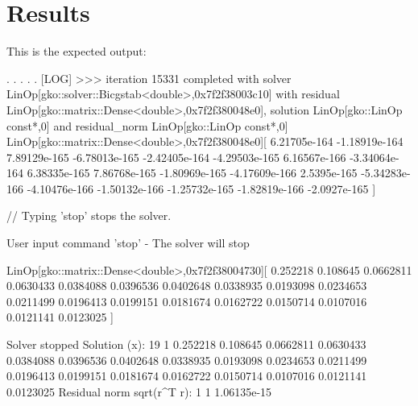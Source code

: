 \section*{Results}

This is the expected output\+:


\begin{DoxyCode}
.
.
.
.
.
[LOG] >>> iteration 15331 completed with solver LinOp[gko::solver::Bicgstab<double>,0x7f2f38003c10] with 
      residual LinOp[gko::matrix::Dense<double>,0x7f2f380048e0], solution LinOp[gko::LinOp \textcolor{keyword}{const}*,0] and 
      residual\_norm LinOp[gko::LinOp \textcolor{keyword}{const}*,0]
LinOp[gko::matrix::Dense<double>,0x7f2f380048e0][
        6.21705e-164
        -1.18919e-164
        7.89129e-165
        -6.78013e-165
        -2.42405e-164
        -4.29503e-165
        6.16567e-166
        -3.34064e-164
        6.38335e-165
        7.86768e-165
        -1.80969e-165
        -4.17609e-166                   
        2.5395e-165
        -5.34283e-166
        -4.10476e-166
        -1.50132e-166
        -1.25732e-165
        -1.82819e-166
        -2.0927e-165
]        

\textcolor{comment}{// Typing 'stop' stops the solver.}

User input command \textcolor{stringliteral}{'stop'} - The solver will stop

LinOp[gko::matrix::Dense<double>,0x7f2f38004730][
        0.252218
        0.108645
        0.0662811
        0.0630433
        0.0384088
        0.0396536
        0.0402648
        0.0338935
        0.0193098
        0.0234653
        0.0211499
        0.0196413
        0.0199151
        0.0181674
        0.0162722
        0.0150714
        0.0107016
        0.0121141
        0.0123025
]

Solver stopped
Solution (x):
19 1
0.252218
0.108645
0.0662811
0.0630433
0.0384088
0.0396536
0.0402648
0.0338935
0.0193098
0.0234653
0.0211499
0.0196413
0.0199151
0.0181674
0.0162722
0.0150714
0.0107016
0.0121141
0.0123025
Residual norm sqrt(r^T r):
1 1
1.06135e-15
\end{DoxyCode}


\label{_Commentsaboutprogramminganddebugging}%
